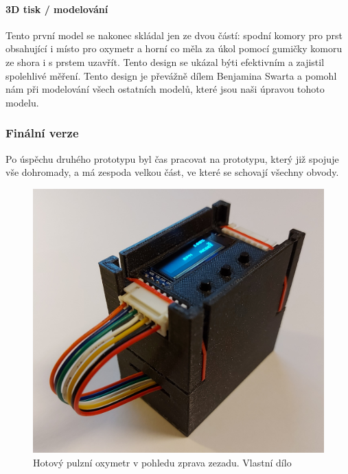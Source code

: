 \paragraph{3D tisk / modelování}
Tento první model se nakonec skládal jen ze dvou částí: spodní komory pro prst obsahující i místo pro oxymetr a horní co měla za úkol pomocí gumičky komoru ze shora i s prstem uzavřít. Tento design se ukázal býti efektivním a zajistil spolehlivé měření. Tento design je převážně dílem Benjamina Swarta a pomohl nám při modelování všech ostatních modelů, které jsou naši úpravou tohoto modelu.
\subsubsection {Finální verze}
Po úspěchu druhého prototypu byl čas pracovat na prototypu, který již spojuje vše dohromady, a má zespoda velkou část, ve které se schovají všechny obvody.
\begin{figure}[ht]
  \includegraphics[scale=0.12, center]{Kapitoly/Prakticka/Obrazky/Finální_prototyp.jpg}
  \caption [Finální prototyp]{Hotový pulzní oxymetr v pohledu zprava zezadu. Vlastní dílo}
  \label{fig:Finální_prototyp}
\end{figure}
